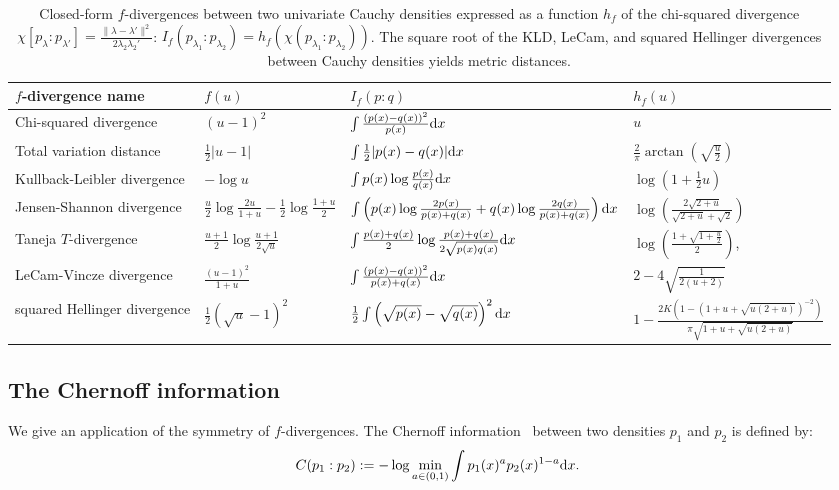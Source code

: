 \documentclass[journal]{IEEEtran}
\begin{document}
\begin{table}[htbp]
\centering
{\renewcommand{\arraystretch}{1.5}
\begin{tabular}{|l|l|l|l|}\hline
$f$-divergence name & $f(u)$ & $I_f(p:q)$ & $h_f(u)$  \\ \hline\hline
Chi-squared divergence & $(u-1)^2$ & $\int \frac{(p(x)-q(x))^2}{p(x)}\mathrm{d}x$ &$u$\\
Total variation distance & $\frac{1}{2}|u-1|$  & $\int \frac{1}{2}|p(x)-q(x)|\mathrm{d}x$  & $\frac{2}{\pi}\arctan\left(\sqrt{\frac{u}{2}}\right)$\\
Kullback-Leibler divergence & $-\log u$ & $\int p(x)\log\frac{p(x)}{q(x)}\mathrm{d}x$ &  $\log(1+\frac{1}{2}u)$\\
Jensen-Shannon divergence & $\frac{u}{2}\log\frac{2u}{1+u}-\frac{1}{2}\log\frac{1+u}{2}$ & $\int \left(p(x)\log\frac{2p(x)}{p(x)+q(x)} 
+q(x)\log\frac{2q(x)}{p(x)+q(x)}\right)\mathrm{d}x$ & $\log\left( \frac{2\sqrt{2+u}}{\sqrt{2+u}+\sqrt{2}} \right)$\\
Taneja $T$-divergence & $\frac{u+1}{2}\log\frac{u+1}{2\sqrt{u}}$ & $\int \frac{p(x)+q(x)}{2}\log  \frac{p(x)+q(x)}{2 \sqrt{p(x) q(x)}} \mathrm{d}x$  &$\log \left( \frac{1+\sqrt{1+\frac{u}{2}}}{2} \right)$,\\
LeCam-Vincze divergence & $\frac{(u-1)^2}{1+u}$ & $\int \frac{(p(x)-q(x))^2}{p(x)+q(x)} \mathrm{d}x$ & $2-4\sqrt{\frac{1}{2(u+2)}}$\\
squared Hellinger divergence & $\frac{1}{2}(\sqrt{u}-1)^2$ & $\frac{1}{2} \int \left(\sqrt{p(x)}-\sqrt{q(x)}\right)^2\mathrm{d}x$ & $1-  \frac{2 K\left( 1 - \left(1+ u + \sqrt{u(2+u)}\right)^{-2}\right)}{\pi \sqrt{1+u + \sqrt{u(2+u)}}}$ \\ \hline
\end{tabular}
}

\caption{Closed-form $f$-divergences between two univariate Cauchy densities expressed as a function $h_f$ of the chi-squared divergence $\chi[p_{\lambda}:p_{\lambda'}]=\frac{\|\lambda-\lambda'\|^2}{2\lambda_2\lambda_2'}$: $I_f(p_{\lambda_1}:p_{\lambda_2})=h_f(\chi(p_{\lambda_1}:p_{\lambda_2}))$. 
The square root of the KLD, LeCam, and squared Hellinger divergences between Cauchy densities yields metric distances.\label{tab:summary}  }
\end{table}



\subsection{The Chernoff information}\label{sec:CID}
We give an application of the symmetry of $f$-divergences. 
The Chernoff information~\cite{Chernoff-2013} between two densities $p_1$ and $p_2$ is defined by:
$$
C(p_1 : p_2) := -\log \min_{a \in (0,1)} \int p_1 (x)^a p_2(x)^{1-a} \mathrm{d}x. 
$$
\end{document}
